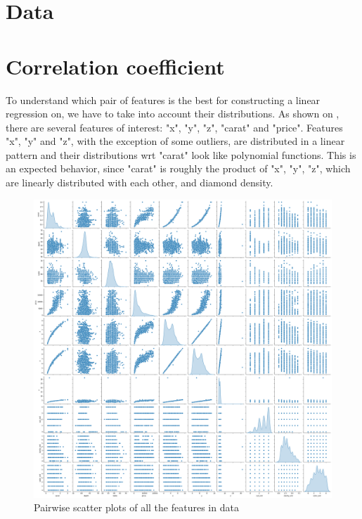 \documentclass[14pt,a4paper]{extarticle}
\begin{document}
	
	\tableofcontents
	
	\section{Data}
	
	
	\section{Correlation coefficient}
	
	To understand which pair of features is the best for constructing a linear regression on, we have to take into account their distributions. As shown on , there are several features of interest: "x", "y", "z", "carat" and "price". Features "x", "y" and "z", with the exception of some outliers, are distributed in a linear pattern and their distributions wrt "carat" look like polynomial functions. This is an expected behavior, since "carat" is roughly the product of "x", "y", "z", which are linearly distributed with each other, and diamond density. 
	
	\begin{figure}[hbtp]
		\centering
		\includegraphics[width=.95\textwidth]{media/pairplot.png}
		\caption{Pairwise scatter plots of all the features in data}
		\label{fig:pairplot}
	\end{figure}
	
\end{document}
